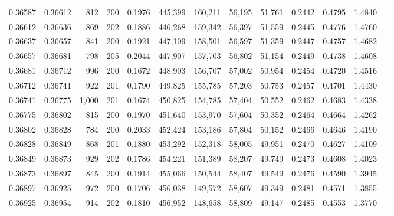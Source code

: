 \begin{tabular}{rrrrrrrrrrrrr}
0.36587 & 0.36612 &   812 & 200 &                                     0.1976 & 445,399 & 160,211 &  56,195 &  51,761 & 0.2442 & 0.4795 & 1.4840 \\
0.36612 & 0.36636 &   869 & 202 &                                     0.1886 & 446,268 & 159,342 &  56,397 &  51,559 & 0.2445 & 0.4776 & 1.4760 \\
0.36637 & 0.36657 &   841 & 200 &                                     0.1921 & 447,109 & 158,501 &  56,597 &  51,359 & 0.2447 & 0.4757 & 1.4682 \\
0.36657 & 0.36681 &   798 & 205 &                                     0.2044 & 447,907 & 157,703 &  56,802 &  51,154 & 0.2449 & 0.4738 & 1.4608 \\
0.36681 & 0.36712 &   996 & 200 &                                     0.1672 & 448,903 & 156,707 &  57,002 &  50,954 & 0.2454 & 0.4720 & 1.4516 \\
0.36712 & 0.36741 &   922 & 201 &                                     0.1790 & 449,825 & 155,785 &  57,203 &  50,753 & 0.2457 & 0.4701 & 1.4430 \\
0.36741 & 0.36775 & 1,000 & 201 &                                     0.1674 & 450,825 & 154,785 &  57,404 &  50,552 & 0.2462 & 0.4683 & 1.4338 \\
0.36775 & 0.36802 &   815 & 200 &                                     0.1970 & 451,640 & 153,970 &  57,604 &  50,352 & 0.2464 & 0.4664 & 1.4262 \\
0.36802 & 0.36828 &   784 & 200 &                                     0.2033 & 452,424 & 153,186 &  57,804 &  50,152 & 0.2466 & 0.4646 & 1.4190 \\
0.36828 & 0.36849 &   868 & 201 &                                     0.1880 & 453,292 & 152,318 &  58,005 &  49,951 & 0.2470 & 0.4627 & 1.4109 \\
0.36849 & 0.36873 &   929 & 202 &                                     0.1786 & 454,221 & 151,389 &  58,207 &  49,749 & 0.2473 & 0.4608 & 1.4023 \\
0.36873 & 0.36897 &   845 & 200 &                                     0.1914 & 455,066 & 150,544 &  58,407 &  49,549 & 0.2476 & 0.4590 & 1.3945 \\
0.36897 & 0.36925 &   972 & 200 &                                     0.1706 & 456,038 & 149,572 &  58,607 &  49,349 & 0.2481 & 0.4571 & 1.3855 \\
0.36925 & 0.36954 &   914 & 202 &                                     0.1810 & 456,952 & 148,658 &  58,809 &  49,147 & 0.2485 & 0.4553 & 1.3770 \\

\end{tabular}
